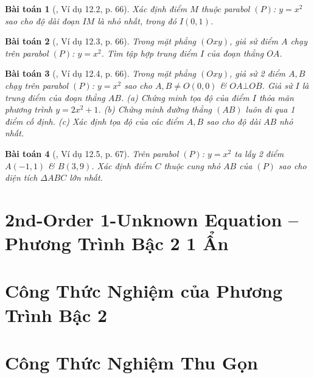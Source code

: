 \documentclass{article}
\newtheorem{baitoan}{Bài toán}
\begin{document}
\begin{baitoan}[\cite{TLCT_THCS_Toan_9_dai_so}, Ví dụ 12.2, p. 66]
	Xác định điểm $M$ thuộc parabol $(P)$: $y = x^2$ sao cho độ dài đoạn $IM$ là nhỏ nhất, trong đó $I(0,1)$.
\end{baitoan}

\begin{baitoan}[\cite{TLCT_THCS_Toan_9_dai_so}, Ví dụ 12.3, p. 66]
	Trong mặt phẳng $(Oxy)$, giả sử điểm $A$ chạy trên parabol $(P)$: $y = x^2$. Tìm tập hợp trung điểm $I$ của đoạn thẳng $OA$.
\end{baitoan}

\begin{baitoan}[\cite{TLCT_THCS_Toan_9_dai_so}, Ví dụ 12.4, p. 66]
	Trong mặt phẳng $(Oxy)$, giả sử 2 điểm $A,B$ chạy trên parabol $(P)$: $y = x^2$ sao cho $A,B\ne O(0,0)$ \& $OA\bot OB$. Giả sử $I$ là trung điểm của đoạn thẳng $AB$. (a) Chứng minh tọa độ của điểm $I$ thỏa mãn phương trình $y = 2x^2 + 1$. (b) Chứng minh đường thẳng $(AB)$ luôn đi qua 1 điểm cố định. (c) Xác định tọa độ của các điểm $A,B$ sao cho độ dài $AB$ nhỏ nhất.
\end{baitoan}

\begin{baitoan}[\cite{TLCT_THCS_Toan_9_dai_so}, Ví dụ 12.5, p. 67]
	Trên parabol $(P)$: $y = x^2$ ta lấy 2 điểm $A(-1,1)$ \& $B(3,9)$. Xác định điểm $C$ thuộc cung nhỏ $AB$ của $(P)$ sao cho diện tích $\Delta ABC$ lớn nhất.
\end{baitoan}


\section{2nd-Order 1-Unknown Equation -- Phương Trình Bậc 2 1 Ẩn}


\section{Công Thức Nghiệm của Phương Trình Bậc 2}


\section{Công Thức Nghiệm Thu Gọn}
\end{document}
